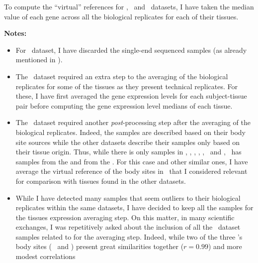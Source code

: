 To compute the \enquote{virtual} references for \vt, \uhlen\ and \gtex\ datasets,
I have taken the median value of each gene across all the
biological replicates for each of their tissues.



\textbf{Notes:}
\begin{itemize}[topsep=0pt,nosep]
        \item For \ibm\ dataset, I have discarded the single-end sequenced samples
            (as already mentioned in ).
        \item The \uhlen\ dataset required an extra  step to
            the averaging of the biological replicates
            for some of the tissues as they present technical replicates.
            For these, I have first averaged the gene expression levels
            for each subject-tissue pair before computing
            the gene expression level medians of each tissue.
        \item The \gtex\ dataset required another \emph{post}-processing
            step after the averaging of the biological replicates.
            Indeed, the samples are described based on their
            body site sources while the other datasets describe their samples
            only based on their tissue origin.
            Thus, while there is only  samples in \castle, \vt,
            \ibm, \uhlen, \cutler, \kuster\ and \pandey,
            \gtex\ has samples from the 
            and from the .
            For this case and other similar ones,
            I have average the virtual reference of the body sites in \gtex\
            that I considered relevant for comparison with tissues found
            in the other datasets.
        \item While I have detected many samples that seem outliers to their
            biological replicates within the same datasets,
            I have decided to keep all the samples for the tissues expression
            averaging step. On this matter,
            in many scientific exchanges,
            I was repetitively asked about the inclusion of all the \gtex\ dataset samples
            related to \tissue{Oesophagus} for the averaging step.
            Indeed, while two of the three \gtex{}'s body sites
            (\ie\  and )
            present great similarities together ($r = 0.99$) and more modest correlations

\end{itemize}
